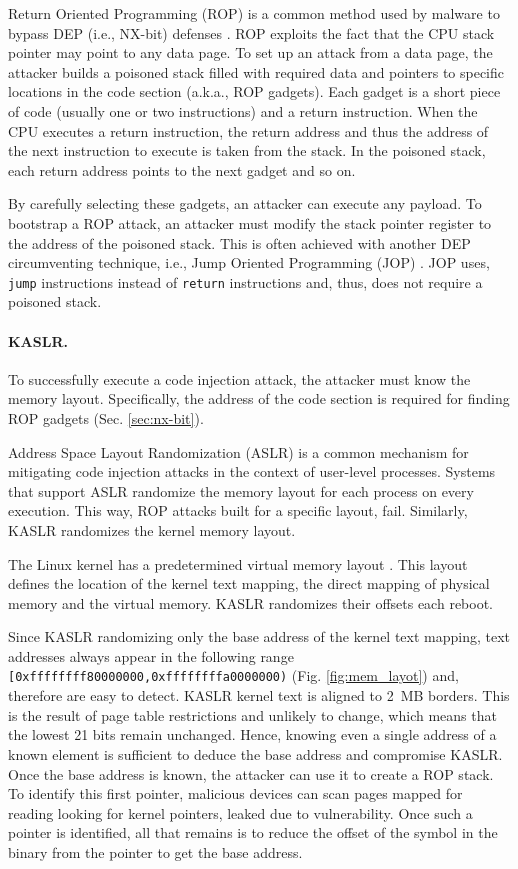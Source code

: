 Return Oriented Programming (ROP) is a common method used by malware to bypass DEP (i.e., NX-bit) defenses \cite{RBSS12}. ROP exploits the fact that the CPU stack pointer may point to any data page. To set up an attack from a data page, the attacker builds a poisoned stack filled with required data and pointers to specific locations in the code section (a.k.a., ROP gadgets). Each gadget is a short piece of code (usually one or two instructions) and a return instruction. When the CPU executes a return instruction, the return address and thus the address of the next instruction to execute is taken from the stack. In the poisoned stack, each return address points to the next gadget and so on. 
 
By carefully selecting these gadgets, an attacker can execute any payload. To bootstrap a ROP attack, an attacker must modify the stack pointer register to the address of the poisoned stack. This is often achieved with another DEP circumventing technique, i.e., Jump Oriented Programming (JOP) \cite{BJFL11}. JOP uses, \texttt{jump} instructions instead of \texttt{return} instructions and, thus, does not require a poisoned stack.

\paragraph{KASLR.}\label{sec:kaslr}

To successfully execute a code injection attack, the attacker must know the memory layout. Specifically, the address of the code section is required for finding ROP gadgets (Sec. \ref{sec:nx-bit}). 

Address Space Layout Randomization (ASLR) is a common mechanism for mitigating code injection attacks in the context of user-level processes. Systems that support ASLR randomize the memory layout for each process on every execution. This way, ROP attacks built for a specific layout, fail. Similarly, KASLR \cite{kalsr} randomizes the kernel memory layout.

The Linux kernel has a predetermined virtual memory layout \cite{mem_layout}. This layout defines the location of the kernel text mapping, the direct mapping of physical memory and the virtual memory. KASLR randomizes their offsets each reboot.

Since KASLR randomizing only the base address of the kernel text mapping, text addresses always appear in the following range \texttt{[0xffffffff80000000,0xffffffffa0000000)} (Fig. \ref{fig:mem_layot}) and, therefore are easy to detect. KASLR kernel text is aligned to 2~MB borders. This is the result of page table restrictions and unlikely to change, which means that the lowest 21 bits remain unchanged. Hence, knowing even a single address of a known element is sufficient to deduce the base address and compromise KASLR. Once the base address is known, the attacker can use it to create a ROP stack.
To identify this first pointer, malicious devices can scan pages mapped for reading looking for kernel pointers, leaked due to \subpage{} vulnerability. Once such a pointer is identified, all that remains is to reduce the offset of the symbol in the binary from the pointer to get the base address.

